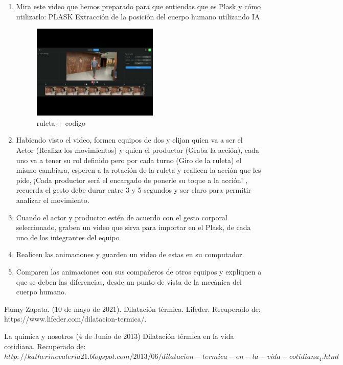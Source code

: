 \documentclass[journal,transmag]{IEEEtran}
\begin{document}
 \begin{enumerate}
 
 \item{Mira este video que hemos preparado para que entiendas que es Plask y cómo utilizarlo: PLASK Extracción de la posición del cuerpo humano utilizando IA}
 
   \begin{figure}[!h]
			\center
			\includegraphics[width=6cm]{video.jpg}
			\caption{ruleta + codigo}
			\label{4}
			\end{figure}
			
			
 \item{ Habiendo visto el video, formen equipos de dos y elijan quien va a ser el Actor (Realiza los movimientos) y quien el productor (Graba la acción), cada uno va a tener su rol definido pero por cada turno (Giro de la ruleta) el mismo cambiara, esperen a la rotación de la ruleta y realicen la acción que les pide, ¡Cada productor será el encargado de ponerle su toque a la acción!  , recuerda el gesto debe durar entre 3 y 5 segundos y ser claro para permitir analizar el movimiento.}
 \item{Cuando el actor y productor estén de acuerdo con el gesto corporal seleccionado, graben un video que sirva para importar en el Plask, de cada uno de los integrantes del equipo}
 \item{ Realicen las animaciones y guarden un video de estas en su computador.}
 \item{Comparen las animaciones con sus compañeros de otros equipos y expliquen a que se deben las diferencias, desde un punto de vista de la mecánica del cuerpo humano.}
 
\end{enumerate}



\ifCLASSOPTIONcaptionsoff
  \newpage
\fi


\begin{thebibliography}{1}


  Fanny Zapata. (10 de mayo de 2021). Dilatación térmica. Lifeder. Recuperado de: https://www.lifeder.com/dilatacion-termica/. 

 La química y nosotros  (4 de Junio de 2013) Dilatación térmica en la vida cotidiana. Recuperado de: $http://katherinevaleria21.blogspot.com/2013/06/dilatacion-termica-en-la-vida-cotidiana_4.html $
\end{thebibliography}
\end{document}
